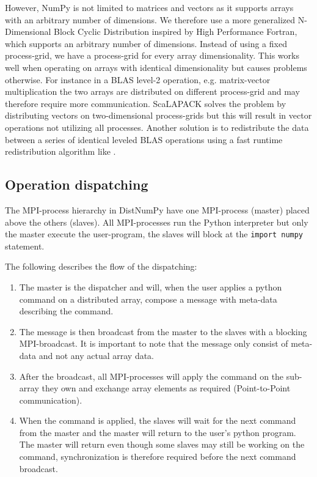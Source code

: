 \documentclass[10pt]{article}
\begin{document}
However, NumPy is not limited to matrices and vectors as it supports arrays with an arbitrary number of dimensions. We therefore use a more generalized N-Dimensional Block Cyclic Distribution inspired by High Performance Fortran\cite{Loveman93}, which supports an arbitrary number of dimensions. Instead of using a fixed process-grid, we have a process-grid for every array dimensionality. This works well when operating on arrays with identical dimensionality but causes problems otherwise. For instance in a BLAS level-2 operation, e.g. matrix-vector multiplication the two arrays are distributed on different process-grid and may therefore require more communication. ScaLAPACK solves the problem by distributing vectors on two-dimensional process-grids but this will result in vector operations not utilizing all processes. Another solution is to redistribute the data between a series of identical leveled BLAS operations using a fast runtime redistribution algorithm like \cite{PrylliT97}.


\subsection{Operation dispatching}
The MPI-process hierarchy in DistNumPy have one MPI-process (master) placed above the others (slaves). All MPI-processes run the Python interpreter but only the master execute the user-program, the slaves will block at the \texttt{import numpy} statement. 

The following describes the flow of the dispatching:
\begin{enumerate}
\item The master is the dispatcher and will, when the user applies a python command on a distributed array, compose a message with meta-data describing the command. 
\item The message is then broadcast from the master to the slaves with a blocking MPI-broadcast. It is important to note that the message only consist of meta-data and not any actual array data.
\item After the broadcast, all MPI-processes will apply the command on the sub-array they own and exchange array elements as required (Point-to-Point communication).
\item When the command is applied, the slaves will wait for the next command from the master and the master will return to the user's python program. The master will return even though some slaves may still be working on the command, synchronization is therefore required before the next command broadcast.
\end{enumerate}
\end{document}
